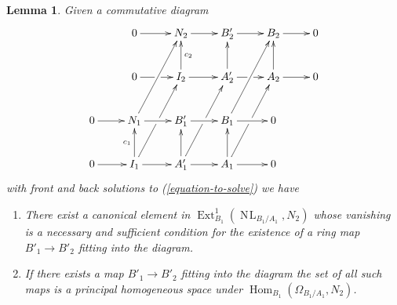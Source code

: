 \documentclass[10pt,a4paper]{amsart}
\theoremstyle{plain}
\newtheorem{lemma}[subsection]{Lemma}
\theoremstyle{definition}
\theoremstyle{remark}
\numberwithin{equation}{subsection}
\def\Hom{\mathop{\mathrm{Hom}}\nolimits}
\def\Ext{\mathop{\mathrm{Ext}}\nolimits}
\def\NL{\mathop{N\!L}\nolimits}
\begin{document}
\begin{lemma}
\label{lemma-huge-diagram}
Given a commutative diagram
$$
\xymatrix{
& 0 \ar[r] & N_2 \ar[r] & B'_2 \ar[r] & B_2 \ar[r] & 0 \\
& 0 \ar[r]|\hole & I_2 \ar[u]_{c_2} \ar[r] &
A'_2 \ar[u] \ar[r]|\hole & A_2 \ar[u] \ar[r] & 0 \\
0 \ar[r] & N_1 \ar[ruu] \ar[r] & B'_1 \ar[r] & B_1 \ar[ruu] \ar[r] & 0 \\
0 \ar[r] & I_1 \ar[ruu]|\hole \ar[u]^{c_1} \ar[r] &
A'_1 \ar[ruu]|\hole \ar[u] \ar[r] & A_1 \ar[ruu]|\hole \ar[u] \ar[r] & 0
}
$$
with front and back solutions to (\ref{equation-to-solve}) we have
\begin{enumerate}
\item There exist a canonical element in
$\Ext^1_{B_1}(\NL_{B_1/A_1}, N_2)$
whose vanishing is a necessary and sufficient condition for the existence
of a ring map $B'_1 \to B'_2$ fitting into the diagram.
\item If there exists a map $B'_1 \to B'_2$ fitting into the diagram
the set of all such maps is a principal homogeneous space under
$\Hom_{B_1}(\Omega_{B_1/A_1}, N_2)$.
\end{enumerate}
\end{lemma}
\end{document}
